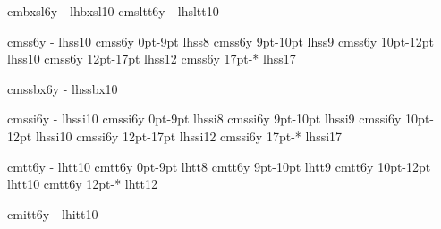 \registertfm cmbxsl6y  -      lhbxsl10 %
\registertfm cmsltt6y  -      lhsltt10 %

\registertfm cmss6y    -      lhss10 %
\registertfm cmss6y 0pt-9pt   lhss8  %
\registertfm cmss6y 9pt-10pt  lhss9  %
\registertfm cmss6y 10pt-12pt lhss10 %
\registertfm cmss6y 12pt-17pt lhss12 %
\registertfm cmss6y 17pt-*    lhss17 %

\registertfm cmssbx6y   -      lhssbx10 %

\registertfm cmssi6y    -      lhssi10 %
\registertfm cmssi6y 0pt-9pt   lhssi8  %
\registertfm cmssi6y 9pt-10pt  lhssi9  %
\registertfm cmssi6y 10pt-12pt lhssi10 %
\registertfm cmssi6y 12pt-17pt lhssi12 %
\registertfm cmssi6y 17pt-*    lhssi17 %

\registertfm cmtt6y    -      lhtt10 %
\registertfm cmtt6y 0pt-9pt   lhtt8  %
\registertfm cmtt6y 9pt-10pt  lhtt9  %
\registertfm cmtt6y 10pt-12pt lhtt10 %
\registertfm cmtt6y 12pt-*    lhtt12 %

\registertfm cmitt6y    -     lhitt10 %




